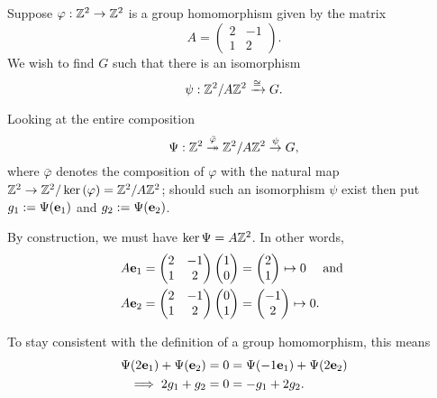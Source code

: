 \documentclass[../algebraNotesMSRI-UP2016.tex]{subfiles}
\begin{document}
\begin{frame}{}{}
\begin{ex}\label{ex:notObviousZmod5Z}
Suppose $\varphi:\mathbb Z^2\to \mathbb Z^2$ is a group homomorphism given by the matrix 
\[
A=\begin{pmatrix}
	2 & -1 \\
	1 & 2
	\end{pmatrix}.
\]
We wish to find $G$ such that there is an isomorphism
\[
\psi:\mathbb Z^2/A\mathbb Z^2\xrightarrow{\cong} G.
\]
\end{ex}

\smallGap
Looking at the entire composition 
\begin{equation}\label{eq:compPresentation}
\Psi:\mathbb Z^2\overset{\bar{\varphi}}{\twoheadrightarrow} \mathbb Z^2/A\mathbb Z^2 \overset{\psi}{\to} G,
\end{equation}
where $\bar{\varphi}$ denotes the composition of $\varphi$ with the natural map %
 $\mathbb Z^2\to\mathbb Z^2/\ker{(\varphi)}=\mathbb Z^2/A\mathbb Z^2$; should such an isomorphism $\psi$ exist then put $g_1:=\Psi(\mathbf e_1)$ and $g_2:=\Psi(\mathbf e_2)$.  %
\end{frame}

\begin{frame}
By construction, we must have $\ker{\Psi}=A\mathbb Z^2$.  In other words,
\begin{align*}
A\mathbf e_1= 
	\begin{pmatrix}
	2 & -1 \\
	1 & 2 
	\end{pmatrix}
	\begin{pmatrix}
	1 \\
	0 
	\end{pmatrix}	
	&= \begin{pmatrix}
		2 \\
		1
		\end{pmatrix}
	\mapsto 0 \quad\text{ and } \\
A\mathbf e_2= 
	\begin{pmatrix}
	2 & -1 \\
	1 & 2 
	\end{pmatrix}
	\begin{pmatrix}
	0 \\
	1 
	\end{pmatrix}	
	&= \begin{pmatrix}
		-1 \\
		2
		\end{pmatrix}
	\mapsto 0.	
\end{align*}

\smallGap
To stay consistent with the definition of a group homomorphism, this means 
\begin{align*}
\Psi(2\mathbf e_1)+\Psi(\mathbf e_2) &= 0 = \Psi(-1\mathbf e_1)+\Psi(2\mathbf e_2) \\
\implies 2g_1+g_2 &= 0 = -g_1+2g_2.
\end{align*}
\end{frame}
\end{document}
